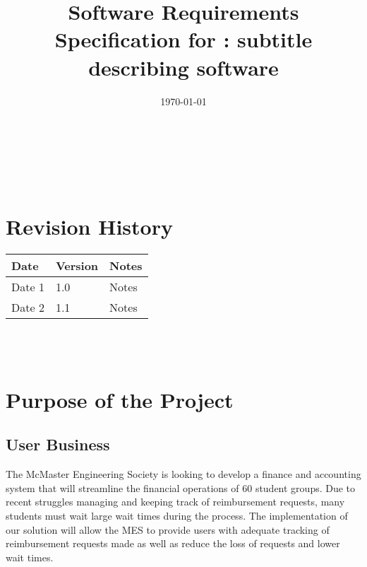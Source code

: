 \documentclass[12pt]{article}
\begin{document}
\title{Software Requirements Specification for \progname: subtitle describing software} 
\author{\authname}
\date{\today}
	
\maketitle

~\newpage


\tableofcontents

~\newpage

\section*{Revision History}

\begin{tabularx}{\textwidth}{p{3cm}p{2cm}X}
\toprule {\textbf{Date}} & {\textbf{Version}} & {\textbf{Notes}}\\
\midrule
Date 1 & 1.0 & Notes\\
Date 2 & 1.1 & Notes\\
\bottomrule
\end{tabularx}

~\\

~\newpage
\section{Purpose of the Project}
\subsection{User Business}
The McMaster Engineering Society is looking to develop a finance and accounting system that will streamline the financial operations of 60 student groups. Due to recent struggles managing and keeping track of reimbursement requests, many students must wait large wait times during the process. The implementation of our solution will allow the MES to provide users with adequate tracking of reimbursement requests made as well as reduce the loss of requests and lower wait times.
\end{document}
